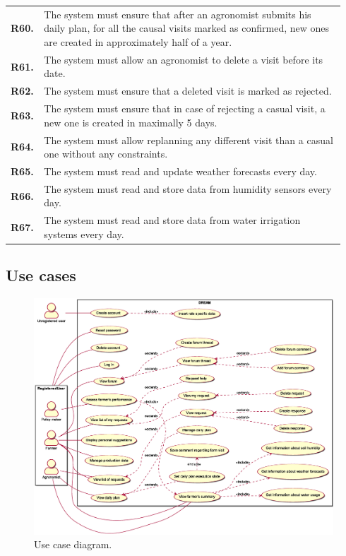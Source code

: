 \begin{longtable}{@{}p{0.06\linewidth} p{0.88\linewidth}}
		\textbf{R60.} & The system must ensure that after an agronomist submits his daily plan, for all the causal visits marked as confirmed, new ones are created in approximately half of a year.\\
		\textbf{R61.} & The system must allow an agronomist to delete a visit before its date.\\
		\textbf{R62.} & The system must ensure that a deleted visit is marked as rejected.\\
		\textbf{R63.} & The system must ensure that in case of rejecting a casual visit, a new one is created in maximally 5 days.\\
		\textbf{R64.} & The system must allow replanning any different visit than a casual one without any constraints.\\
		
		\textbf{R65.} & The system must read and update weather forecasts every day. \\
		\textbf{R66.} & The system must read and store data from humidity sensors every day. \\
		\textbf{R67.} & The system must read and store data from water irrigation systems every day. \\

        
		
	\bottomrule
\end{longtable}

\subsection{Use cases}
\begin{figure}[H]
    \centering
    \includegraphics[width=0.92\textheight, keepaspectratio, origin=c, angle=90]{diagrams/use_case}
    \caption{Use case diagram.}
    \label{fig:uc_diagram}
\end{figure}

